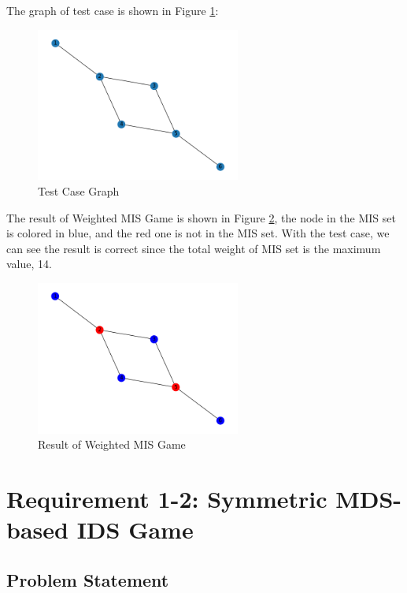 \documentclass[a4paper, oneside, final, 12pt]{scrartcl} %
\begin{document}
The graph of test case is shown in Figure \ref{fig:Test Case Graph}:

\begin{figure}[h]
  \centering
  \includegraphics[width=0.6\textwidth]{./image/original_graph.png}
  \caption{Test Case Graph}
  \label{fig:Test Case Graph}
\end{figure}

The result of Weighted MIS Game is shown in Figure \ref{fig:Result of Weighted MIS Game},
the node in the MIS set is colored in blue, and the red one is not in the MIS set.
With the test case, we can see the result is correct since the total weight of MIS set
is the maximum value, 14.

\begin{figure}[h]
  \centering
  \includegraphics[width=0.6\textwidth]{./image/result_weighted_mis.png}
  \caption{Result of Weighted MIS Game}
  \label{fig:Result of Weighted MIS Game}
\end{figure}
\section{Requirement 1-2: Symmetric MDS-based IDS Game}


\subsection{Problem Statement}
\end{document}
